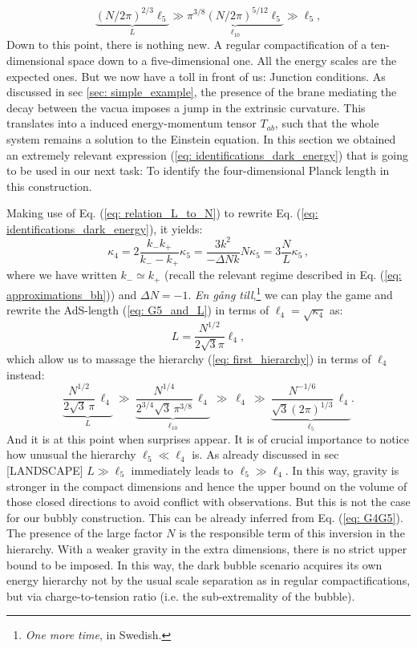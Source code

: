 \begin{equation}\label{eq: first_hierarchy}
    \underbrace{\left(N/2 \pi \right)^{2/3} \ell_5}_{L} \gg\underbrace{\pi^{3/8} \left(N/2\pi\right)^{5/12} \ell_{5}}_{\ell_{10}}\gg \ell_{5},
\end{equation}
Down to this point, there is nothing new. A regular compactification of a ten-dimensional space down to a five-dimensional one. All the energy scales are the expected ones. But we now have a toll in front of us: Junction conditions. As discussed in sec \ref{sec: simple_example}, the presence of the brane mediating the decay between the vacua imposes a jump in the extrinsic curvature. This translates into a induced energy-momentum tensor $T_{ab}$, such that the whole system remains a solution to the Einstein equation. In this section we obtained an extremely relevant expression (\ref{eq: identifications_dark_energy}) that is going to be used in our next task: To identify the four-dimensional Planck length in this construction.

Making use of Eq. (\ref{eq: relation_L_to_N}) to rewrite Eq. (\ref{eq: identifications_dark_energy}), it yields:
\begin{equation} \label{eq: G4G5}
\kappa_4=2\frac{k_- k_+}{k_- - k_+} \kappa_5 =\frac{3 k^2}{-\Delta N k}N \kappa_5 =3\frac{N}{L} \kappa_5 \, , 
\end{equation}
where we have written $k_{-} \simeq k_{+}$ (recall the relevant regime described in Eq. (\ref{eq: approximations_bh})) and $\Delta N = -1$. \textit{En gång till},\footnote{\textit{One more time}, in Swedish.} we can play the game and rewrite the AdS-length (\ref{eq: G5_and_L}) in terms of $\ell_{4} = \sqrt{\kappa_{4}}$ as:
\begin{equation}\label{eq: Ldpendingl4}
    L = \frac{N^{1/2}}{2\sqrt{3} \pi} \ell_4,
\end{equation}
which allow us to massage the hierarchy (\ref{eq: first_hierarchy}) in terms of $\ell_4$ instead:
\begin{equation}\label{eq: second_hierarchy}
    \underbrace{\frac{N^{1/2}}{2 \sqrt{3}\, \pi} \,\ell_4}_{L} \:\gg\: \underbrace{\frac{N^{1/4}}{2^{3/4} \sqrt{3} \,\pi^{3/8}} \, \ell_{4}} _{\ell_{10}} \:\gg\: \ell_4 \:\gg\: \underbrace{\frac{N^{-1/6}}{\sqrt{3} (2\pi)^{1/3}} \, \ell_{4}}_{\ell_{5}}. 
\end{equation}
And it is at this point when surprises appear. It is of crucial importance to notice how unusual the hierarchy $\ell_{5} \ll \ell_{4}$ is. As already discussed in sec [LANDSCAPE] $L \gg \ell_{5}$ immediately leads to $\ell_{5} \gg \ell_{4}$. In this way, gravity is stronger in the compact dimensions and hence the upper bound on the volume of those closed directions to avoid conflict with observations. But this is not the case for our bubbly construction. This can be already inferred from Eq. (\ref{eq: G4G5}). The presence of the large factor $N$ is the responsible term of this inversion in the hierarchy. With a weaker gravity in the extra dimensions, there is no strict upper bound to be imposed. In this way, the dark bubble scenario acquires its own energy hierarchy not by the usual scale separation as in regular compactifications, but via charge-to-tension ratio (i.e. the sub-extremality of the bubble).

